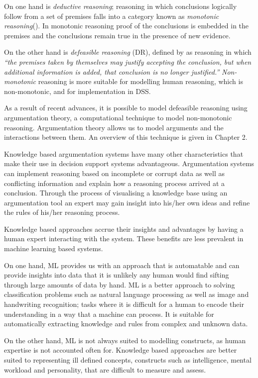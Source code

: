 On one hand is \textit{deductive reasoning}; reasoning in which conclusions logically follow from a set of premises falls into a category known as \textit{monotonic reasoning}(\cite{baroni1997full}). In monotonic reasoning proof of the conclusions is embedded in the premises and the conclusions remain true in the presence of new evidence.

On the other hand is \textit{defeasible reasoning} (DR), defined by \cite{pollock1987defeasible} as reasoning in which \textit{``the premises taken by themselves may justify accepting the conclusion, but when additional information is added, that conclusion is no longer justified.''} \textit{Non-monotonic} reasoning is more suitable for modelling human reasoning, which is non-monotonic, and for implementation in DSS.

As a result of recent advances, it is possible to model defeasible reasoning using argumentation theory, a computational technique to model non-monotonic reasoning. Argumentation theory allows us to model arguments and the interactions between them. An overview of this technique is given in Chapter 2.

Knowledge based argumentation systems have many other characteristics that make their use in decision support systems advantageous. Argumentation systems can implement reasoning based on incomplete or corrupt data as well as conflicting information and explain how a reasoning process arrived at a conclusion. Through the process of visualising a knowledge base using an argumentation tool an expert may gain insight into his/her own ideas and refine the rules of his/her reasoning process. 

Knowledge based approaches accrue their insights and advantages by having a human expert interacting with the system. These benefits are less prevalent in machine learning based systems. 

On one hand, ML provides us with an approach that is automatable and can provide insights into data that it is unlikely any human would find sifting through large amounts of data by hand. ML is a better approach to solving classification problems such as natural language processing as well as image and handwriting recognition; tasks where it is difficult for a human to encode their understanding in a way that a machine can process. It is suitable for automatically extracting knowledge and rules from complex and unknown data.

On the other hand, ML is not always suited to modelling constructs, as human expertise is not accounted often for. Knowledge based approaches are better suited to representing ill defined concepts, constructs such as intelligence, mental workload and personality, that are difficult to measure and assess. 

